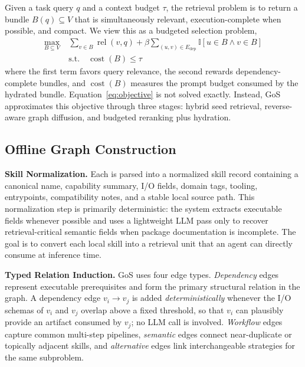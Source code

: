 Given a task query $q$ and a context budget $\tau$, the retrieval problem is to return a bundle $B(q) \subseteq V$ that is simultaneously relevant, execution-complete when possible, and compact. We view this as a budgeted selection problem,
\begin{equation}
\begin{aligned}
\max_{B \subseteq V} \; & \sum_{v \in B} \operatorname{rel}(v, q) + \beta \!\!\!\!\sum_{(u,v) \in E_{\mathrm{dep}}} \!\!\!\!\mathbb{I}[u \in B \wedge v \in B] \\
& \text{s.t.} \quad \operatorname{cost}(B) \le \tau
\end{aligned}
\label{eq:objective}
\end{equation}
where the first term favors query relevance, the second rewards dependency-complete bundles, and $\operatorname{cost}(B)$ measures the prompt budget consumed by the hydrated bundle. Equation~\eqref{eq:objective} is not solved exactly. Instead, GoS approximates this objective through three stages: hybrid seed retrieval, reverse-aware graph diffusion, and budgeted reranking plus hydration.

\subsection{Offline Graph Construction}
\noindent\textbf{Skill Normalization.}
Each \skillpackage{} is parsed into a normalized skill record containing a canonical name, capability summary, I/O fields, domain tags, tooling, entrypoints, compatibility notes, and a stable local source path. This normalization step is primarily deterministic: the system extracts executable fields whenever possible and uses a lightweight LLM pass only to recover retrieval-critical semantic fields when package documentation is incomplete. The goal is to convert each local skill into a retrieval unit that an agent can directly consume at inference time.

\noindent\textbf{Typed Relation Induction.}
GoS uses four edge types. \emph{Dependency} edges represent executable prerequisites and form the primary structural relation in the graph. A dependency edge $v_i \rightarrow v_j$ is added \emph{deterministically} whenever the I/O schemas of $v_i$ and $v_j$ overlap above a fixed threshold, so that $v_i$ can plausibly provide an artifact consumed by $v_j$; no LLM call is involved. \emph{Workflow} edges capture common multi-step pipelines, \emph{semantic} edges connect near-duplicate or topically adjacent skills, and \emph{alternative} edges link interchangeable strategies for the same subproblem.


